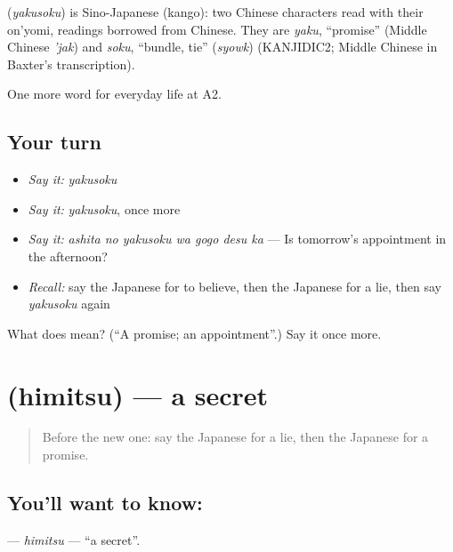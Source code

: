 \begin{cousinweb}
\textbf{} (\emph{yakusoku}) is Sino-Japanese (kango): two Chinese characters read with their on'yomi, readings borrowed from Chinese. They are \emph{yaku}, \textquotedblleft{}promise\textquotedblright{} (Middle Chinese \emph{'jak}) and \emph{soku}, \textquotedblleft{}bundle, tie\textquotedblright{} (\emph{syowk}) (KANJIDIC2; Middle Chinese in Baxter's transcription).
\end{cousinweb}

\begin{grammarlens}[title={What you've built}]
One more word for everyday life at A2.
\end{grammarlens}

\subsection*{Your turn}
\begin{itemize}
\raggedright
  \item \emph{Say it:} \emph{yakusoku}
  \item \emph{Say it:} \emph{yakusoku}, once more
  \item \emph{Say it:} \emph{ashita no yakusoku wa gogo desu ka} — Is tomorrow's appointment in the afternoon?
  \item \emph{Recall:} say the Japanese for to believe, then the Japanese for a lie, then say \emph{yakusoku} again
\end{itemize}

\begin{tcolorbox}[breakable,colback=teal!4,colframe=teal!35!black,title={Before you move on}]
What does  mean? (\textquotedblleft{}A promise; an appointment\textquotedblright{}.) Say it once more.
\end{tcolorbox}
\section[\texorpdfstring{\ja{ひみつ} (himitsu)}{ひみつ (himitsu)}]{ (himitsu) — a secret}

\label{lesson:JA-C248-himitsu}



\begin{quote}
Before the new one: say the Japanese for a lie, then the Japanese for a promise.
\end{quote}

\subsection*{You'll want to know: }
\textbf{} — \emph{himitsu} — \textquotedblleft{}a secret\textquotedblright{}.

